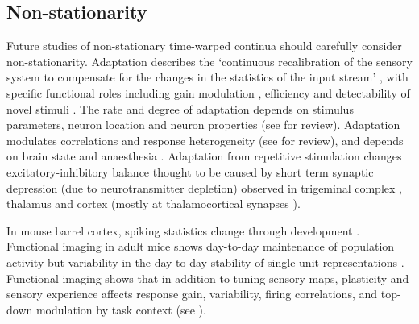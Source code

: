 \documentclass{article}
\begin{document}




\subsection*{Non-stationarity}

Future studies of non-stationary time-warped continua should carefully consider non-stationarity. Adaptation describes the `continuous recalibration of the sensory system to compensate for the changes in the statistics of the input stream' \cite{kheradpezhouh2017response}, with specific functional roles including gain modulation \cite{ahissar2000transformation, heiss2008shift, khatri2009stimulus, mohar2013opposite}, efficiency \cite{sharpee2006adaptive} and detectability of novel stimuli \cite{dragoi2002dynamics, ulanovsky2003processing}. The rate and degree of adaptation depends on stimulus parameters, neuron location and neuron properties (see \cite{kheradpezhouh2017response} for review). Adaptation modulates correlations and response heterogeneity (see \cite{kheradpezhouh2017response} for review), and depends on brain state and anaesthesia \cite{castro2004absence, katz2012trial}. Adaptation from repetitive stimulation changes excitatory-inhibitory balance \cite{higley2006balanced, heiss2008shift, malina2013imbalance} thought to be caused by short term synaptic depression (due to neurotransmitter depletion) observed in trigeminal complex \cite{mohar2013opposite}, thalamus \cite{deschenes2003relay} and cortex \cite{higley2006balanced, heiss2008shift, malina2013imbalance} (mostly at thalamocortical synapses \cite{chung2002short}).

In mouse barrel cortex, spiking statistics change through development \cite{van2017layer}. Functional imaging in adult mice shows day-to-day maintenance of population activity \cite{margolis2012reorganization, mayrhofer2015sparse} but variability in the day-to-day stability of single unit representations \cite{mayrhofer2015sparse}. Functional imaging shows that in addition to tuning sensory maps, plasticity and sensory experience affects response gain, variability, firing correlations, and top-down modulation by task context (see \cite{lemessurier2018plasticity}). 
\end{document}
